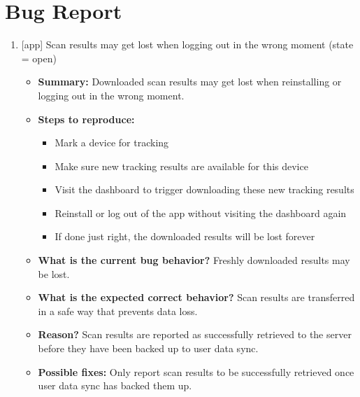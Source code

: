 \chapter{Bug Report}
\begin{enumerate}
\item {[app] Scan results may get lost when logging out in the wrong moment (state = open)}
\begin{itemize}	
\item \textbf{Summary: } Downloaded scan results may get lost when reinstalling or logging out in the wrong moment.\\
\item \textbf{Steps to reproduce: }
\begin{itemize}
	\item	Mark a device for tracking
	\item	Make sure new tracking results are available for this device
	\item	Visit the dashboard to trigger downloading these new tracking results
	\item	Reinstall or log out of the app without visiting the dashboard again
	\item	If done just right, the downloaded results will be lost forever
\end{itemize}
\item \textbf{What is the current bug behavior? }Freshly downloaded results may be lost.\\
\item \textbf{What is the expected correct behavior? }Scan results are transferred in a safe way that prevents data loss.\\
\item \textbf{Reason? }Scan results are reported as successfully retrieved to the server before they have been backed up to user data sync.\\
\item \textbf{Possible fixes: }Only report scan results to be successfully retrieved once user data sync has backed them up.\\
\end{itemize}


\end{enumerate}
